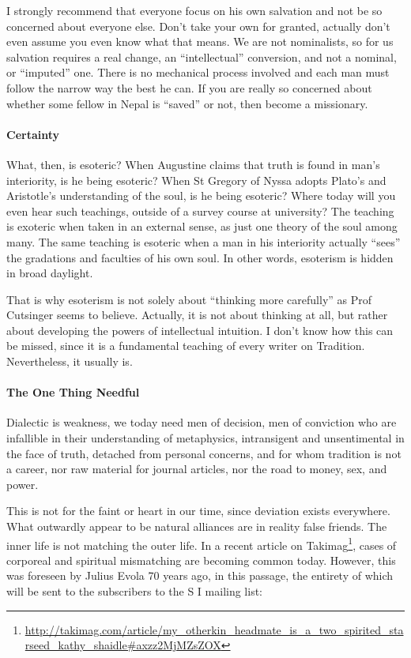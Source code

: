 I strongly recommend that everyone focus on his own salvation and not be so concerned about everyone else. Don't take your own for granted, actually don't even assume you even know what that means. We are not nominalists, so for us salvation requires a real change, an ``intellectual'' conversion, and not a nominal, or ``imputed'' one. There is no mechanical process involved and each man must follow the narrow way the best he can. If you are really so concerned about whether some fellow in Nepal is ``saved'' or not, then become a missionary.

\paragraph{Certainty}


What, then, is esoteric? When Augustine claims that truth is found in man's interiority, is he being esoteric? When St Gregory of Nyssa adopts Plato's and Aristotle's understanding of the soul, is he being esoteric? Where today will you even hear such teachings, outside of a survey course at university? The teaching is exoteric when taken in an external sense, as just one theory of the soul among many. The same teaching is esoteric when a man in his interiority actually ``sees'' the gradations and faculties of his own soul. In other words, esoterism is hidden in broad daylight.

That is why esoterism is not solely about ``thinking more carefully'' as Prof Cutsinger seems to believe. Actually, it is not about thinking at all, but rather about developing the powers of intellectual intuition. I don't know how this can be missed, since it is a fundamental teaching of every writer on Tradition. Nevertheless, it usually is.

\paragraph{The One Thing Needful}


Dialectic is weakness, we today need men of decision, men of conviction who are infallible in their understanding of metaphysics, intransigent and unsentimental in the face of truth, detached from personal concerns, and for whom tradition is not a career, nor raw material for journal articles, nor the road to money, sex, and power.

This is not for the faint or heart in our time, since deviation exists everywhere. What outwardly appear to be natural alliances are in reality false friends. The inner life is not matching the outer life. In a recent article on Takimag\footnote{\url{http://takimag.com/article/my\_otherkin\_headmate\_is\_a\_two\_spirited\_starseed\_kathy\_shaidle\#axzz2MjMZsZOX}}, cases of corporeal and spiritual mismatching are becoming common today. However, this was foreseen by Julius Evola 70 years ago, in this passage, the entirety of which will be sent to the subscribers to the S I mailing list:

